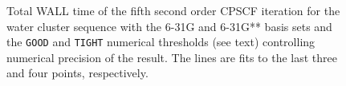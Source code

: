 \documentclass[twocolumn,showpacs,preprintnumbers,amsmath,amssymb]{revtex4}
\begin{document}
\begin{figure}[t]
  \caption{\protect
    Total WALL time of the fifth second order CPSCF iteration for
    the water cluster sequence with the 6-31G and 6-31G** 
    basis sets and the {\tt GOOD} and {\tt TIGHT} 
    numerical thresholds (see text) controlling numerical
    precision of the result. The lines are fits to the 
    last three and four points, respectively.
  }\label{Beta_scaling}
\end{figure}
\end{document}
